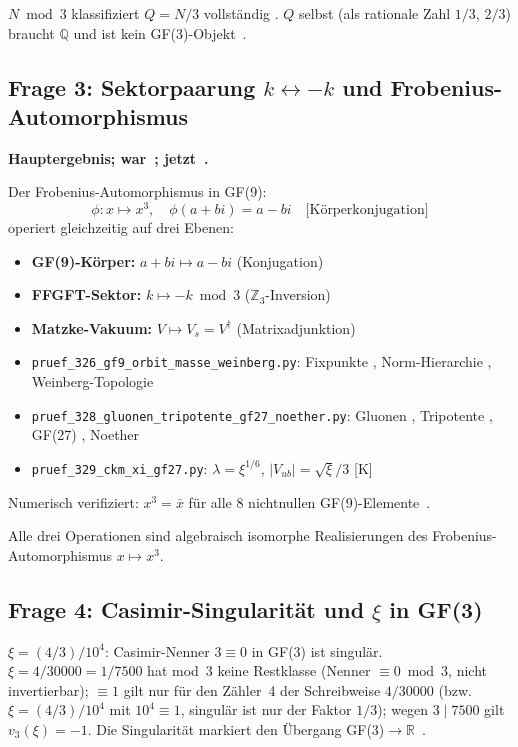 \begin{keyresult}
$N\bmod 3$ klassifiziert $Q=N/3$ vollständig \BM.
$Q$ selbst (als rationale Zahl $1/3$, $2/3$) braucht $\mathbb{Q}$
und ist kein GF(3)-Objekt~\KM.
\end{keyresult}

\subsection{Frage 3: Sektorpaarung $k\leftrightarrow-k$ und Frobenius-Automorphismus}

\textbf{Hauptergebnis; war~\SM; jetzt~\BM.}

Der Frobenius-Automorphismus in GF(9):
\begin{equation}
  \phi: x\mapsto x^3,\quad \phi(a+bi)=a-bi \quad \text{[Körperkonjugation]}
\end{equation}
operiert gleichzeitig auf drei Ebenen:
\begin{itemize}
  \item \textbf{GF(9)-Körper:} $a+bi\mapsto a-bi$ (Konjugation)
  \item \textbf{FFGFT-Sektor:} $k\mapsto -k\bmod 3$ ($\mathbb{Z}_3$-Inversion)
  \item \textbf{Matzke-Vakuum:} $V\mapsto V_s = V^\dagger$ (Matrixadjunktion)
  \item \texttt{pruef\_326\_gf9\_orbit\_masse\_weinberg.py}: Fixpunkte \BM, Norm-Hierarchie \BM, Weinberg-Topologie \KM
  \item \texttt{pruef\_328\_gluonen\_tripotente\_gf27\_noether.py}: Gluonen \BM, Tripotente \BM, GF(27) \KM, Noether \BM
  \item \texttt{pruef\_329\_ckm\_xi\_gf27.py}: $\lambda=\xi^{1/6}$, $|V_{ub}|=\sqrt{\xi}/3$ [K]
\end{itemize}
Numerisch verifiziert: $x^3=\bar{x}$ für alle 8 nichtnullen GF(9)-Elemente~\BM.

\begin{keyresult}[Status~\BM]
Alle drei Operationen sind algebraisch isomorphe Realisierungen
des Frobenius-Automorphismus $x\mapsto x^3$.
\end{keyresult}

\subsection{Frage 4: Casimir-Singularität und $\xi$ in GF(3)}

$\xi = (4/3)/10^4$: Casimir-Nenner $3\equiv 0$ in GF(3) ist singulär.
$\xi = 4/30000 = 1/7500$ hat mod~3 keine Restklasse (Nenner $\equiv 0 \bmod 3$, nicht invertierbar);
$\equiv 1$ gilt nur für den Zähler~4 der Schreibweise $4/30000$ (bzw.\ $\xi = (4/3)/10^4$ mit $10^4 \equiv 1$, singulär ist nur der Faktor $1/3$);
wegen $3 \mid 7500$ gilt $v_3(\xi) = -1$.
Die Singularität markiert den Übergang GF(3)$\to\mathbb{R}$~\KM.

